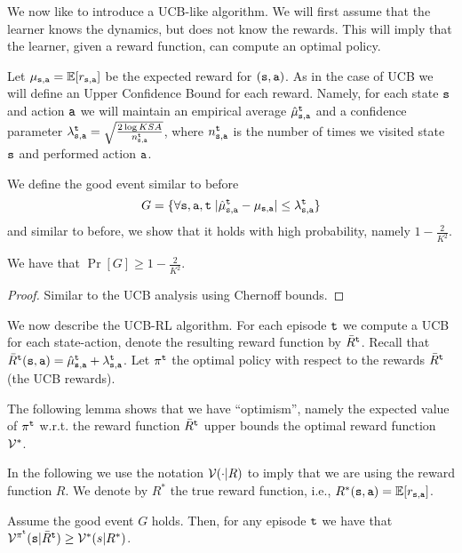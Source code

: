 We now like to introduce a UCB-like algorithm. We will first assume that the learner knows the dynamics, but does not know the rewards. This will imply that the learner, given a reward function, can compute an optimal policy.

Let $\mu_{{\tt s},{\tt a}}=\mathbb{E}[r_{{\tt s},{\tt a}}]$ be the expected reward for $({\tt s},{\tt a})$.
%
As in the case of UCB we will define an Upper Confidence Bound for each reward. Namely, for each state ${\tt s}$ and action ${\tt a}$ we will maintain an empirical average $\hat{\mu}^{\tt t}_{{\tt s},{\tt a}}$ and a confidence parameter $\lambda^{\tt t}_{{\tt s},{\tt a}}=\sqrt{\frac{2\log KSA}{n_{{\tt s},{\tt a}}^{\tt t}}}$, where $n_{{\tt s},{\tt a}}^{\tt t}$ is the number of times we visited state ${\tt s}$ and performed action ${\tt a}$.

We define the good event similar to before
\[
G=\{\forall{\tt s},{\tt a}, {\tt t}\; |\hat{\mu}^{\tt t}_{{\tt s},{\tt a}}-\mu_{{\tt s},{\tt a}}|\leq \lambda_{{\tt s},{\tt a}}^{\tt t}\}
\]
and similar to before, we show that it holds with high probability, namely $1-\frac{2}{K^2}$.

\begin{lemma}
    We have that  $\Pr[G]\geq 1-\frac{2}{K^2}$.
\end{lemma}

\begin{proof}
    Similar to the UCB analysis using Chernoff bounds.
\end{proof}

We now describe the UCB-RL algorithm. For each episode ${\tt t}$ we compute a UCB for each state-action, denote the resulting reward function by $\bar{R}^{\tt t}$. Recall that $\bar{R}^{\tt t}({\tt s},{\tt a})=\hat{\mu}_{{\tt s},{\tt a}}^{\tt t}+\lambda_{{\tt s},{\tt a}}^{\tt t}$.  Let $\pi^{\tt t}$ the optimal policy with respect to the rewards $\bar{R}^{\tt t}$ (the UCB rewards).

The following lemma shows that we have ``optimism'', namely the expected value of $\pi^{\tt t}$ w.r.t. the reward function $\bar{R}^{\tt t}$ upper bounds the optimal reward function $\mathcal{V}^*$.

In the following we use the notation $\mathcal{V}(\cdot|R)$ to imply that we are using the reward function $R$. We denote by $R^*$ the true reward function, i.e., $R^*({\tt s},{\tt a})=\mathbb{E}[r_{{\tt s},{\tt a}}]$.

\begin{lemma}
    Assume the good event $G$ holds. Then, for any episode ${\tt t}$ we have that $\mathcal{V}^{\pi^{\tt t}}({\tt s} | \bar{R}^{\tt t})\geq \mathcal{V}^*(s|R^*)$.
\end{lemma}

